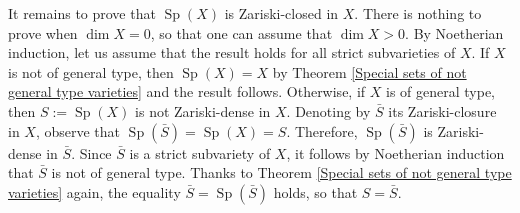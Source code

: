 \documentclass[11pt,letterpaper]{amsart}
\theoremstyle{plain}
\DeclareMathOperator{\Sp}{Sp}
\begin{document}
It remains to prove that $ \Sp(X)$ is Zariski-closed in $X$. There is nothing to prove when $\dim X = 0$, so that one can assume that $\dim X > 0$. By Noetherian induction, let us assume that the result holds for all strict subvarieties of $X$. If $X$ is not of general type, then $ \Sp(X) = X$ by Theorem \ref{Special sets of not general type varieties} and the result follows. Otherwise, if $X$ is of general type, then $S :=\Sp(X)$ is not Zariski-dense in $X$. Denoting by $\bar S$ its Zariski-closure in $X$, observe that $\Sp(\bar S) = \Sp(X) = S$.
Therefore, $\Sp(\bar S)$ is Zariski-dense in $\bar S$. Since $\bar S$ is a strict subvariety of $X$, it follows by Noetherian induction that $\bar S$ is not of general type. Thanks to Theorem \ref{Special sets of not general type varieties} again, the equality $\bar S = \Sp(\bar S)$ holds, so that $S = \bar S$.




\small




\end{document}
